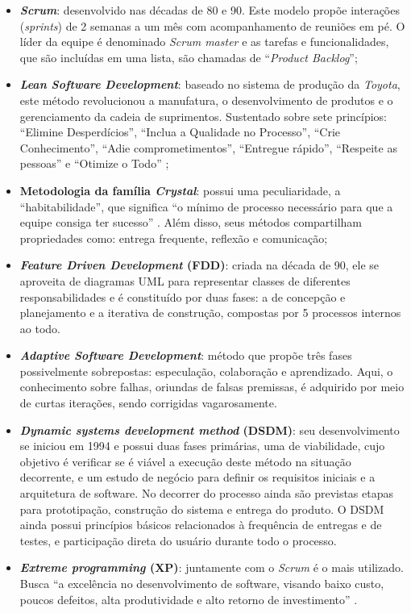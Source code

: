 \begin{itemize}
 \item \textbf{\textit{Scrum}}: desenvolvido nas décadas de 80 e 90. Este modelo propõe interações (\textit{sprints}) de 2 semanas a um mês com acompanhamento de reuniões em pé. O líder da equipe é denominado \textit{Scrum master} e as tarefas e funcionalidades, que são incluídas em uma lista, são chamadas de ``\textit{Product Backlog}'';   
 \item \textbf{\textit{Lean Software Development}}: baseado no sistema de produção da \textit{Toyota}, este método revolucionou a manufatura, o desenvolvimento de produtos e o gerenciamento da cadeia de suprimentos. Sustentado sobre sete princípios: ``Elimine Desperdícios'', ``Inclua a Qualidade no Processo'', ``Crie Conhecimento'', ``Adie comprometimentos'', ``Entregue rápido'', ``Respeite as pessoas'' e ``Otimize o Todo'' \cite{sato2007uso};
 \item \textbf{Metodologia da família \textit{Crystal}}: possui uma peculiaridade, a ``habitabilidade'', que significa ``o mínimo de processo necessário para que a equipe consiga ter sucesso'' \cite{sato2007uso}. Além disso, seus métodos compartilham propriedades como: entrega frequente, reflexão e comunicação;
 \item \textbf{\textit{Feature Driven Development} (FDD)}: criada na década de 90, ele se aproveita de diagramas UML para representar classes de diferentes responsabilidades e é constituído por duas fases: a de concepção e planejamento e a iterativa de construção, compostas por 5 processos internos ao todo.
 \item \textbf{\textit{Adaptive Software Development}}: método que propõe três fases possivelmente sobrepostas: especulação, colaboração e aprendizado. Aqui, o conhecimento sobre falhas, oriundas de falsas premissas, é adquirido por meio de curtas iterações, sendo corrigidas vagarosamente.
 \item \textbf{\textit{Dynamic systems development method} (DSDM)}: seu desenvolvimento se iniciou em 1994 e possui duas fases primárias, uma de viabilidade, cujo objetivo é verificar se é viável a execução deste método na situação decorrente, e um estudo de negócio para definir os requisitos iniciais e a arquitetura de software. No decorrer do processo ainda são previstas etapas para prototipação, construção do sistema e entrega do produto. O DSDM ainda possui princípios básicos relacionados à frequência de entregas e de testes, e participação direta do usuário durante todo o processo. 
 \item \textbf{\textit{Extreme programming} (XP)}: juntamente com o \textit{Scrum} é o mais utilizado. Busca ``a excelência no desenvolvimento de software, visando baixo custo, poucos defeitos, alta produtividade e alto retorno de investimento'' \cite{sato2007uso}.
\end{itemize}


